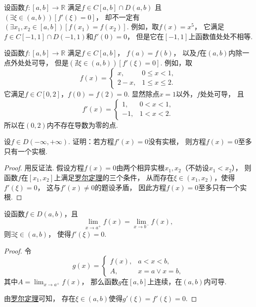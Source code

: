 \begin{example}
设函数\(f\colon[a,b]\to\mathbb{R}\)
满足\(f\in C[a,b]\cap D(a,b)\)
且\((\exists\xi\in(a,b))[f'(\xi)=0]\)，
却不一定有\((\exists x_1,x_2\in[a,b])[f(x_1)=f(x_2)]\).
例如，取\(f(x)=x^5\)，
它满足\(f\in C[-1,1]\cap D(-1,1)\)和\(f'(0)=0\)，
但是它在\([-1,1]\)上函数值处处不相等.
\end{example}

\begin{example}
设函数\(f\colon[a,b]\to\mathbb{R}\)
满足\(f\in C[a,b]\)，
\(f(a)=f(b)\)，
以及\(f\)在\((a,b)\)内除一点外处处可导，
但是\((\nexists\xi\in(a,b))[f'(\xi)=0]\).
例如，取\begin{equation*}
	f(x) = \left\{ \begin{array}{cl}
		x, & 0\leq x<1, \\
		2-x, & 1\leq x\leq 2.
	\end{array} \right.
\end{equation*}
它满足\(f\in C[0,2]\)，\(f(0)=f(2)=0\).
显然除点\(x=1\)以外，\(f\)处处可导，
且\begin{equation*}
	f'(x) = \left\{ \begin{array}{rl}
		1, & 0<x<1, \\
		-1, & 1<x<2.
	\end{array} \right.
\end{equation*}
所以在\((0,2)\)内不存在导数为零的点.
\end{example}

\begin{example}
设\(f \in D(-\infty,+\infty)\).
证明：若方程\(f'(x) = 0\)没有实根，
则方程\(f(x) = 0\)至多只有一个实根.
\begin{proof}
用反证法.
假设方程\(f(x) = 0\)由两个相异实根\(x_1,x_2\)（不妨设\(x_1 < x_2\)），
则函数\(f\)在\([x_1,x_2]\)上满足\hyperref[theorem:微分中值定理.罗尔定理]{罗尔定理}的三个条件，
从而存在\(\xi\in(x_1,x_2)\)，使得\(f'(\xi) = 0\)，
这与\(f'(x) \neq 0\)的题设矛盾，
因此方程\(f(x) = 0\)至多只有一个实根.
\end{proof}
\end{example}

\begin{corollary}
设函数\(f \in D(a,b)\)，且\begin{equation*}
	\lim_{x \to a^+} f(x)
	= \lim_{x \to b^-} f(x),
\end{equation*}
则\(\exists\xi\in(a,b)\)，
使得\(f'(\xi) = 0\).
\begin{proof}
令\begin{equation*}
	g(x) = \left\{ \begin{array}{cl}
		f(x), & a < x < b, \\
		A, & x = a \lor x = b,
	\end{array} \right.
\end{equation*}
其中\(A = \lim_{x \to a^+} f(x)\)，
那么函数\(g\)在\([a,b]\)上连续，在\((a,b)\)内可导.

由\hyperref[theorem:微分中值定理.罗尔定理]{罗尔定理}可知，
存在\(\xi\in(a,b)\)使得\(g'(\xi) = f'(\xi) = 0\).
\end{proof}
\end{corollary}

